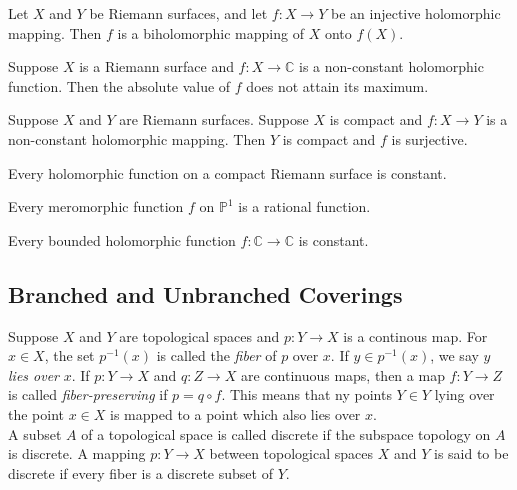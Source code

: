 \begin{cor}

Let $X$ and $Y$ be Riemann surfaces, and let $f: X \to Y$ be an injective holomorphic mapping. Then $f$ is a biholomorphic mapping of $X$ onto $f(X)$.

\end{cor}

\begin{cor}
Suppose $X$ is a Riemann surface and $f:X \to \mathbb{C}$ is a non-constant holomorphic function. Then the absolute value of $f$ does not attain its maximum.
\end{cor}

\begin{thm}

Suppose $X$ and $Y$ are Riemann surfaces. Suppose $X$ is compact and $f:X \to Y$ is a non-constant holomorphic mapping. Then $Y$ is compact and $f$ is surjective.
 
\end{thm}

\begin{cor}

Every holomorphic function on a compact Riemann surface is constant.

\end{cor}

\begin{cor}

Every meromorphic function $f$ on $\mathbb{P}^1$ is a rational function.

\end{cor}

\begin{thm}

Every bounded holomorphic function $f: \mathbb{C} \to \mathbb{C}$ is constant.

\end{thm}

\subsection{Branched and Unbranched Coverings}

\begin{defn}

Suppose $X$ and $Y$ are topological spaces and $p:Y \to X$ is a continous map. For $x \in X$, the set $p^{-1}(x)$ is called the \textit{fiber} of $p$ over $x$. If $y \in p^{-1}(x)$, we say $y$ \textit{lies over} $x$. If $p: Y \to X$ and $q:Z \to X$ are continuous maps, then a map $f:Y \to Z$ is called \textit{fiber-preserving} if $p=q \circ f$. This means that ny points $Y \in Y$ lying over the point $x \in X$ is mapped to a point which also lies over $x$. 
\smallskip \\
\indent A subset $A$ of a topological space is called discrete if the subspace topology on $A$ is discrete. A mapping $p:Y \to X$ between topological spaces $X$ and $Y$ is said to be discrete if every fiber is a discrete subset of $Y$.
\end{defn}

